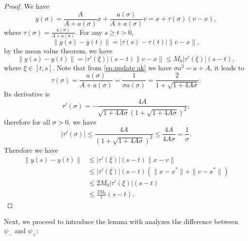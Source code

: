 \documentclass{article}
\begin{document}
\begin{proof}
    We have
    \begin{equation*}
        y(\sigma) = \frac{A}{A+a(\sigma)}x+\frac{a(\sigma)}{A+a(\sigma)}v = x + \tau (\sigma) (v-x),
    \end{equation*}
    where $\tau(\sigma) = \frac{a(\sigma)}{A+a(\sigma)}.$ For any $s\geq t>0$,
    \begin{equation*}
        \|y(s)-y(t)\| = \left|\tau(s)-\tau(t)\right| \|v-x\|,
    \end{equation*}
    by the mean value theorem, we have
    \begin{equation*}
        \|y(s)-y(t)\| = \left|\tau'(\xi)\right|(s-t) \|v-x\|\leq M_0\left|\tau'(\xi)\right|(s-t),
    \end{equation*}
    where $\xi \in \left[t,s\right]$. Note that from \eqref{eq.update ak} we have $\sigma a^2=a+A$, it leads to
    \begin{equation*}
        \tau(\sigma) = \frac{a(\sigma)}{A+a(\sigma)} = \frac{1}{\sigma a(\sigma)} = \frac{2}{1+\sqrt{1+4A\sigma}}.
    \end{equation*}
    Its derivative is
    \begin{equation*}
        \tau'(\sigma) = -\frac{4A}{\sqrt{1+4A\sigma}\left(1+\sqrt{1+4A\sigma}\right)^2},
    \end{equation*}
    therefore for all $\sigma>0$, we have
    \begin{equation*}
        \left|\tau'(\sigma)\right| \leq \frac{4A}{\left(1+\sqrt{1+4A\sigma}\right)^2}  \leq \frac{4A}{4A\sigma}  = \frac{1}{\sigma}.
    \end{equation*}
    Therefore we have
    \begin{equation*}
        \begin{aligned}
            \|y(s)-y(t)\| & \leq \left|\tau'(\xi)\right|(s-t)\|x-v\|                          \\
                          & \leq \left|\tau'(\xi)\right|(s-t)\left(\|x-x^*\|+\|v-x^*\|\right) \\
                          & \leq 2M_0\left|\tau'(\xi)\right|(s-t)                             \\
                          & \leq \frac{2M_0}{t}(s-t).
        \end{aligned}
    \end{equation*}
\end{proof}
Next, we proceed to introduce the lemma with analyzes the difference between $\psi_-$ and $\psi_+$:
\end{document}

